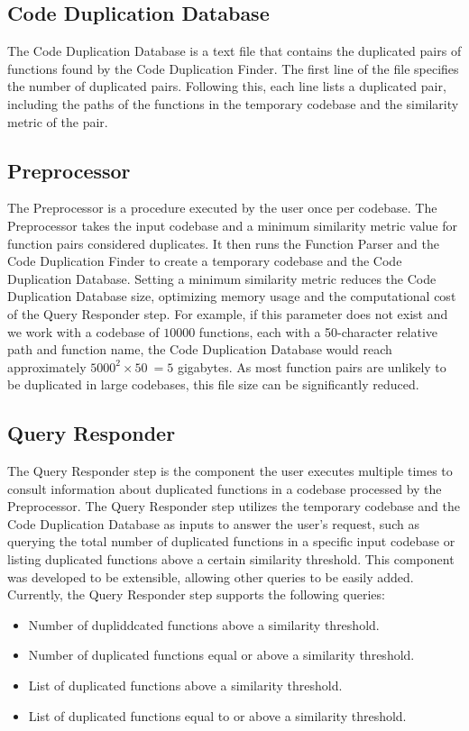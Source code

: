 \subsection{Code Duplication Database}

The Code Duplication Database is a text file that contains the duplicated pairs of functions found by the Code Duplication Finder. The first line of the file specifies the number of duplicated pairs. Following this, each line lists a duplicated pair, including the paths of the functions in the temporary codebase and the similarity metric of the pair.

\subsection{Preprocessor}
\label{subsec:setup}

The Preprocessor is a procedure executed by the user once per codebase. 
The Preprocessor takes the input codebase and a minimum similarity metric value for function pairs considered duplicates. 
It then runs the Function Parser and the Code Duplication Finder to create a temporary codebase and the Code Duplication Database. 
Setting a minimum similarity metric reduces the Code Duplication Database size, optimizing memory usage and the computational 
cost of the Query Responder step. For example, if this parameter does not exist and we work with a codebase of $10000$ functions, 
each with a 50-character relative path and function name, the Code Duplication Database would reach approximately $5000^2 \times 50 ~= 5$ gigabytes. 
As most function pairs are unlikely to be duplicated in large codebases, this file size can be significantly reduced.

\subsection{Query Responder}


The Query Responder step is the component the user executes multiple times to consult information about duplicated functions in a codebase processed by the Preprocessor. The Query Responder step utilizes the temporary codebase and the Code Duplication Database as inputs to answer the user's request, such as querying the total number of duplicated functions in a specific input codebase or listing duplicated functions above a certain similarity threshold. This component was developed to be extensible, allowing other queries to be easily added. Currently, the Query Responder step supports the following queries:

\begin{itemize}
	\item Number of dupliddcated functions above a similarity threshold.
	\item Number of duplicated functions equal or above a similarity threshold.
	\item List of duplicated functions above a similarity threshold.
	\item List of duplicated functions equal to or above a similarity threshold.
\end{itemize}
